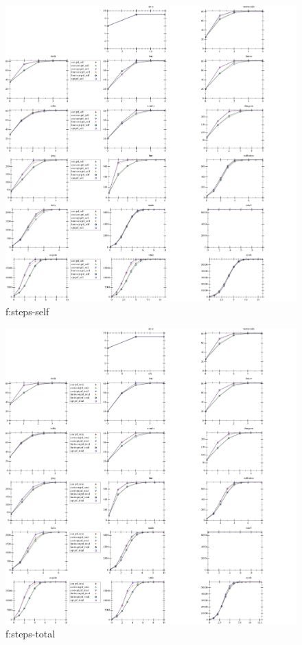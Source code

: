 \begin{figure}[t]
  \includegraphics[width=\textwidth]{data/cdf-steps_prf_self.pdf}
  \caption{f:steps-self}
  \label{f:steps-self}
\end{figure}

\begin{figure}[t]
  \includegraphics[width=\textwidth]{data/cdf-steps_prf_total.pdf}
  \caption{f:steps-total}
  \label{f:steps-total}
\end{figure}

\clearpage

